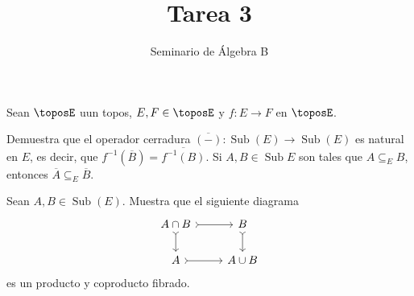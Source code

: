 \documentclass[article]{memoir}
\title{Tarea 3}
\author{Seminario de Álgebra B}
\date{}
\DeclareMathOperator{\sub}{Sub}
\begin{document}
\maketitle

\begin{exercise}
  Sean \(\toposE\) uun topos, \(E,F\in\toposE\) y \(f\colon E\to F\) en \(\toposE\).
  \begin{tasks}
    \task Demuestra que el operador cerradura \(\overline{(-)}\colon\sub(E)\to\sub(E)\) es natural en \(E\), es decir, que \(f^{-1}(\overline{B})=\overline{f^{-1}(B)}\).
    \task Si \(A,B\in\sub{E}\) son tales que \(A\subseteq_E B\), entonces \(\overline{A}\subseteq_E \overline{B}\). 
  \end{tasks}
\end{exercise}

\begin{exercise}
  Sean \(A,B\in\sub(E)\). Muestra que el siguiente diagrama
  \[
    \begin{tikzcd}[arrows=tail, ampersand replacement=\&]
      A\cap B\ar{r}\ar{d} \& B\ar{d}\\
      A\ar{r} \& A\cup B
    \end{tikzcd}
  \]
  es un producto y coproducto fibrado.
\end{exercise}
\end{document}
